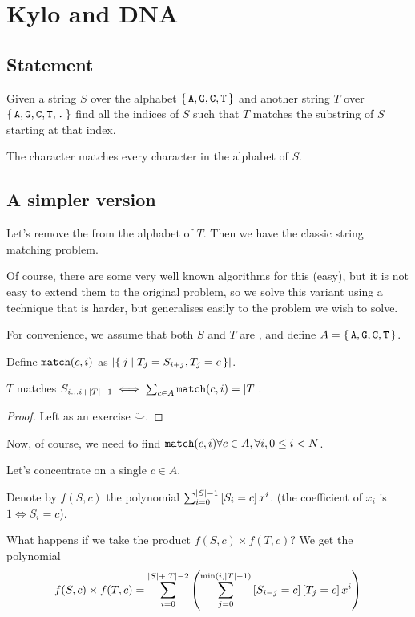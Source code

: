 \section{Kylo and DNA}
	\subsection{Statement}
		Given a string $S$ over the alphabet
		$\{\,\texttt{A}, \texttt{G}, \texttt{C}, \texttt{T}\,\}$ and another string
		$T$ over $\{\,\texttt{A}, \texttt{G}, \texttt{C}, \texttt{T}, \texttt{.}\,\}$
		find all the indices of $S$ such that $T$ matches the substring
		of $S$ starting at that index.

		The character  matches every character in the alphabet of $S$.

	\subsection{A simpler version}
		Let's remove the  from the alphabet of $T$.
		Then we have the classic string matching problem.

		Of course, there are some very well known algorithms for this (easy), but it
		is not easy to extend them to the original problem, so we solve this variant
		using a technique that is harder, but generalises easily to the problem we
		wish to solve.

		For convenience, we assume that both $S$ and $T$ are , and define
		$A = \{\,\texttt{A}, \texttt{G}, \texttt{C}, \texttt{T}\,\}$.

		Define $\texttt{match}(c, i)$ as $\card{\{\, j\mid T_j = S_{i + j}, T_j = c\,\}}$.

		\begin{claim}
		$T$ matches $S_{i\dots i + \card{T} - 1} \iff \sum_{c \in A} \ttt{match}(c, i) = \card{T}$.
		\end{claim}

		\begin{proof}
		Left as an exercise $\ddot\smallsmile$.
		\end{proof}

		Now, of course, we need to find $\texttt{match}(c, i) \forall c\in A,
		\forall i, 0 \leq i < N$.

		Let's concentrate on a single $c \in A$.

		Denote by $f(S, c)$ the polynomial
		$\sum_{i = 0}^{\mid S\mid - 1} \left[S_i = c\right] x^i$.
		(the coefficient of $x_i$ is $1 \iff S_i = c$).

		What happens if we take the product $f(S, c) \times f(T, c)$?
		We get the polynomial
		\begin{align*}
			f(S, c) \times f(T, c) &=
			\sum_{i = 0}^{\mid S\mid + \mid T\mid - 2} \left(\sum_{j = 0}^{\min(i, \mid T\mid - 1)}
			\left[S_{i - j} = c\right]\left[T_{j} = c\right] x^i\right)\\
		\end{align*}

